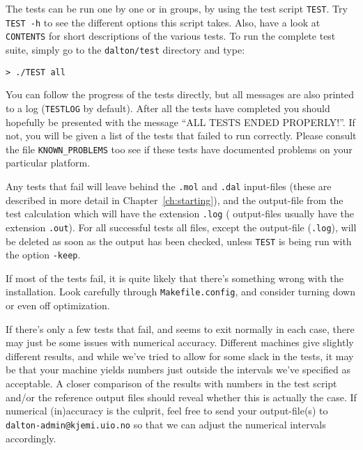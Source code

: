 The tests can be run one by one or in groups, by using the test script
\verb|TEST|. Try \verb|TEST -h| to see the different options this
script takes. Also, have a look at \verb|CONTENTS|
for short descriptions of the various tests. To run the
complete test suite, simply go to the \verb|dalton/test| directory and
type:
\begin{verbatim}
> ./TEST all
\end{verbatim}
You can follow the progress of the tests directly, but all messages
are also printed to a log (\verb|TESTLOG| by default). After all the
tests have completed you should hopefully be presented with the
message ``ALL TESTS ENDED PROPERLY!''. If not, you will be given a
list of the tests that failed to run correctly. Please consult the file
\verb|KNOWN_PROBLEMS| too see if these tests have documented problems
on your particular platform.

Any tests that fail will leave behind the \verb|.mol| and \verb|.dal|
input-files (these are described in more detail in
Chapter~\ref{ch:starting}), and the output-file from the test
calculation which will have the extension \verb|.log| ({\dalton}
output-files usually have the extension \verb|.out|). For all
successful tests all files, except the output-file (\verb|.log|),
will be deleted as soon as the output has been checked, unless
\verb|TEST| is being run with the option \verb|-keep|.

If most of the tests fail, it is quite likely that there's something
wrong with the installation. Look carefully through
\verb|Makefile.config|, and consider turning down or even off
optimization.

If there's only a few tests that fail, and {\dalton} seems to exit
normally in each case, there may just be some issues with numerical
accuracy. Different machines give slightly different results, and
while we've tried to allow for some slack in the tests, it may be
that your machine yields numbers just outside the intervals we've
specified as acceptable. A closer comparison of the results with
numbers in the test script and/or the reference output files should
reveal whether this is actually the case. If numerical (in)accuracy is
the culprit, feel free to send your output-file(s) to
\verb|dalton-admin@kjemi.uio.no| so that we can adjust the numerical
intervals accordingly.
